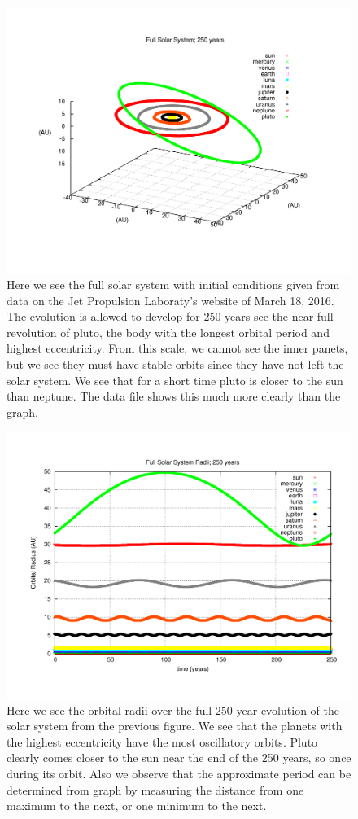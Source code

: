 \documentclass[11pt,a4paper]{article}
\begin{document}
\begin{figure}
\centering
\includegraphics[width=1.0\textwidth]{fullss_250years.pdf}
\caption{Here we see the full solar system with initial conditions given from data on the Jet Propulsion Laboraty's website of March 18, 2016. The evolution is allowed to develop for 250 years see the near full revolution of pluto, the body with the longest orbital period and highest eccentricity. From this scale, we cannot see the inner panets, but we see they must have stable orbits since they have not left the solar system. We see that for a short time pluto is closer to the sun than neptune. The data file shows this much more clearly than the graph.}
\end{figure}
\begin{figure}
\centering
\includegraphics[width=1.0\textwidth]{fullss_radii_250years.pdf}
\caption{Here we see the orbital radii over the full 250 year evolution of the solar system from the previous figure. We see that the planets with the highest eccentricity have the most oscillatory orbits. Pluto clearly comes closer to the sun near the end of the 250 years, so once during its orbit. Also we observe that the approximate period can be determined from graph by measuring the distance from one maximum to the next, or one minimum to the next.}
\end{figure}
\end{document}
